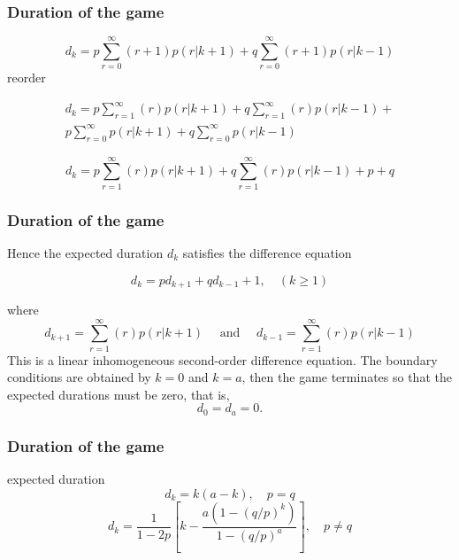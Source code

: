 \documentclass[spanish]{beamer}
\begin{document}
\begin{frame}
\frametitle{Duration of the game}

\begin{equation*}
d_{k} = p \sum_{r=0}^{\infty} (r+1)p(r \vert k+1)+ q \sum_{r=0}^{\infty}(r+1)p(r\vert k -1)
\end{equation*}
reorder 

\begin{multline*}
d_{k} = p \sum_{r=1}^{\infty} (r)p(r \vert k+1)+ q \sum_{r=1}^{\infty}(r)p(r\vert k -1)+ \\
p \sum_{r=0}^{\infty} p(r \vert k+1)+ q \sum_{r=0}^{\infty}p(r\vert k -1)
\end{multline*}

 
\begin{equation*}
d_{k} = p \sum_{r=1}^{\infty} (r)p(r \vert k+1)+ q \sum_{r=1}^{\infty}(r)p(r\vert k -1)+p+q
\end{equation*}
\end{frame}
\begin{frame}
\frametitle{Duration of the game}
Hence the expected duration $d_{k}$ satisfies the difference equation

\begin{equation*}
d_{k} = p d_{k+1} + q d_{k-1} + 1, \quad (k \geq 1)
\end{equation*}

where
\begin{equation*}
d_{k+1} = \sum_{r=1}^{\infty} (r)p(r \vert k+1) \quad \text{  and  } \quad d_{k-1}=\sum_{r=1}^{\infty}(r)p(r\vert k -1)
\end{equation*}
This is a linear inhomogeneous second-order difference equation. The boundary conditions are obtained by $k = 0$ and $k = a$, then the game terminates so that the expected durations must be zero, that is, 
\begin{equation*}
d_{0} = d_{a} = 0.
\end{equation*}


\end{frame}

\begin{frame}
\frametitle{Duration of the game}
\begin{block}{expected duration}
\begin{equation*}
d_{k} = k(a - k), \quad p = q
\end{equation*}
\begin{equation*}
d_{k} = \frac{1}{1-2p} \left[  k-\frac{a(1-(q/p)^k)}{1-(q/p)^a} \right] , \quad p \neq q
\end{equation*}


\end{block}

\end{frame}
\end{document}
